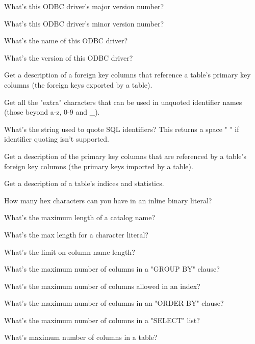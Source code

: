 \begin{description}
What's this ODBC driver's major version number? 

What's this ODBC driver's minor version number? 

What's the name of this ODBC driver? 

What's the version of this ODBC driver? 

Get a description of a foreign key columns that reference a table's primary key columns (the foreign keys exported by a table). 

Get all the "extra" characters that can be used in unquoted identifier names (those beyond a-z, 0-9 and \_). 

What's the string used to quote SQL identifiers? This returns a space " " if identifier quoting isn't supported. 

Get a description of the primary key columns that are referenced by a table's foreign key columns (the primary keys imported by a table). 

Get a description of a table's indices and statistics. 

How many hex characters can you have in an inline binary literal? 

What's the maximum length of a catalog name? 

What's the max length for a character literal? 

What's the limit on column name length? 

What's the maximum number of columns in a "GROUP BY" clause? 

What's the maximum number of columns allowed in an index? 

What's the maximum number of columns in an "ORDER BY" clause? 

What's the maximum number of columns in a "SELECT" list? 

What's maximum number of columns in a table? 


\end{description}
